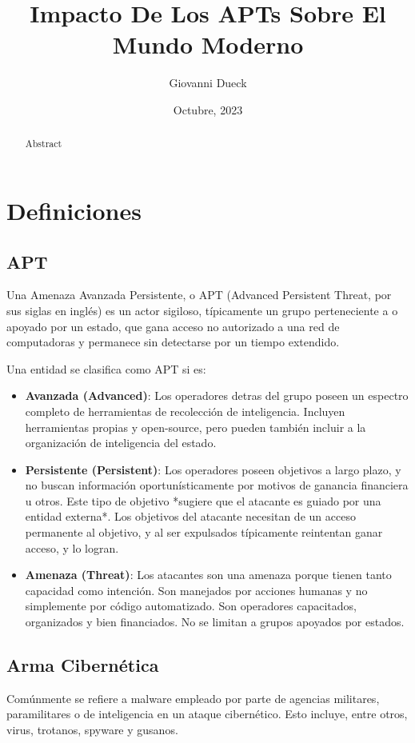 \documentclass{article}
\title{Impacto De Los APTs Sobre El Mundo Moderno}
\author{Giovanni Dueck}
\date{Octubre, 2023}
\begin{document}
\maketitle

\begin{abstract}
    Abstract
\end{abstract}

\section{Definiciones}
\subsection{APT}
Una Amenaza Avanzada Persistente, o APT (Advanced Persistent Threat, por sus siglas en inglés) es un actor sigiloso, típicamente un grupo perteneciente a o apoyado por un estado, que gana acceso no autorizado a una red de computadoras y permanece sin detectarse por un tiempo extendido. 

Una entidad se clasifica como APT si es:
\begin{itemize}
    \item {\bf Avanzada (Advanced)}: Los operadores detras del grupo poseen un espectro completo de herramientas de recolección de inteligencia. Incluyen herramientas propias y open-source, pero pueden también incluir a la organización de inteligencia del estado.
    \item {\bf Persistente (Persistent)}: Los operadores poseen objetivos a largo plazo, y no buscan información oportunísticamente por motivos de ganancia financiera u otros. Este tipo de objetivo *sugiere que el atacante es guiado por una entidad externa*. Los objetivos del atacante necesitan de un acceso permanente al objetivo, y al ser expulsados típicamente reintentan ganar acceso, y lo logran.
    \item {\bf Amenaza (Threat)}: Los atacantes son una amenaza porque tienen tanto capacidad como intención. Son manejados por acciones humanas y no simplemente por código automatizado. Son operadores capacitados, organizados y bien financiados. No se limitan a grupos apoyados por estados.
\end{itemize}

\subsection{Arma Cibernética}
Comúnmente se refiere a malware empleado por parte de agencias militares, paramilitares o de inteligencia en un ataque cibernético. Esto incluye, entre otros, virus, trotanos, spyware y gusanos.
\end{document}
